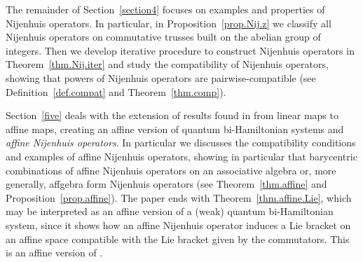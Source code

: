 \documentclass[pdftex]{sigma}
\numberwithin{equation}{section}
\begin{document}
The remainder of Section~\ref{section4} focuses on examples and properties of Nijenhuis operators.
In particular, in Proposition~\ref{prop.Nij.z} we classify all Nijenhuis operators on commutative trusses built on the abelian group of integers. Then we develop iterative procedure to construct Nijenhuis operators in Theorem~\ref{thm.Nij.iter} and study the compatibility of Nijenhuis operators, showing that powers of Nijenhuis operators are pairwise-compatible (see Definition~\ref{def.compat} and Theorem~\ref{thm.comp}).

Section~\ref{five} deals with the extension of results found in \cite{4} from linear maps to affine maps, creating an affine version of quantum bi-Hamiltonian systems and \textit{affine Nijenhuis operators}.
In particular we discusses the compatibility conditions and examples of affine Nijenhuis operators, showing in particular that barycentric combinations of affine Nijenhuis operators on an associative algebra or, more generally, affgebra form Nijenhuis operators (see Theorem~\ref{thm.affine} and Proposition~\ref{prop.affine}). The paper ends with Theorem~\ref{thm.affine.Lie}, which may be interpreted as an affine version of a (weak) quantum bi-Hamiltonian system, since it shows how an affine Nijenhuis operator induces a Lie bracket on an affine space compatible with the Lie bracket given by the commutators. This is an affine version of \cite[Theorem~8]{4}.
\end{document}
